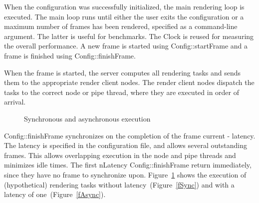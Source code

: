 \documentclass[10pt,a4]{scrartcl}
\newcommand{\fig}[1]{Figure~\ref{#1}}
\begin{document}
When the configuration was successfully initialized, the main rendering
loop is executed. The main loop runs until either the user exits the
configuration or a maximum number of frames has been rendered, specified
as a command-line argument. The latter is useful for benchmarks. The
\textsf{Clock} is reused for measuring the overall performance. A new
frame is started using \textsf{Config::startFrame} and a frame is
finished using \textsf{Config::finishFrame}.

When the frame is started, the server computes all rendering tasks and
sends them to the appropriate render client nodes. The render client
nodes dispatch the tasks to the correct node or pipe thread, where they
are executed in order of arrival.

\begin{figure}
  \hfil
  {\caption{\small\label{fSyncAsync}Synchronous and asynchronous execution}}
\end{figure}
\textsf{Config::finishFrame} synchronizes on the completion of the frame
\textsf{current - latency}. The latency is specified in the
configuration file, and allows several outstanding frames. This allows
overlapping execution in the node and pipe threads and minimizes idle
times. The first \textsf{nLatency Config::finishFrame} return
immediately, since they have no frame to synchronize
upon. \fig{fSyncAsync} shows the execution of (hypothetical) rendering
tasks without latency~(\fig{fSync}) and with a latency of
one~(\fig{fAsync}). 
\end{document}
